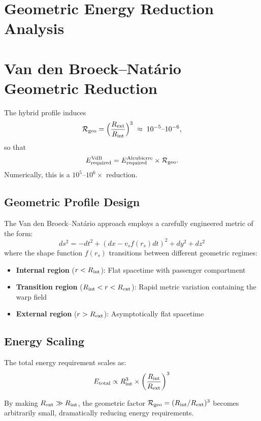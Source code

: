 \documentclass[11pt]{article}
\begin{document}
\section*{Geometric Energy Reduction Analysis}

\section{Van den Broeck–Natário Geometric Reduction}
The hybrid profile induces
\[
  \mathcal{R}_{\rm geo} 
  = \Bigl(\frac{R_{\rm ext}}{R_{\rm int}}\Bigr)^3 
  \;\approx\; 10^{-5}\text{–}10^{-6},
\]
so that
\[
  E_{\rm required}^{\rm VdB} 
  = E_{\rm required}^{\rm Alcubierre} \times \mathcal{R}_{\rm geo}.
\]
Numerically, this is a $10^5$–$10^6\times$ reduction.

\subsection*{Geometric Profile Design}
The Van den Broeck–Natário approach employs a carefully engineered metric of the form:
\[
  ds^2 = -dt^2 + (dx - v_s f(r_s) dt)^2 + dy^2 + dz^2
\]
where the shape function $f(r_s)$ transitions between different geometric regimes:
\begin{itemize}
\item \textbf{Internal region} ($r < R_{\rm int}$): Flat spacetime with passenger compartment
\item \textbf{Transition region} ($R_{\rm int} < r < R_{\rm ext}$): Rapid metric variation containing the warp field
\item \textbf{External region} ($r > R_{\rm ext}$): Asymptotically flat spacetime
\end{itemize}

\subsection*{Energy Scaling}
The total energy requirement scales as:
\[
  E_{\rm total} \propto R_{\rm int}^3 \times \left(\frac{R_{\rm int}}{R_{\rm ext}}\right)^3
\]

By making $R_{\rm ext} \gg R_{\rm int}$, the geometric factor $\mathcal{R}_{\rm geo} = (R_{\rm int}/R_{\rm ext})^3$ becomes arbitrarily small, dramatically reducing energy requirements.
\end{document}
